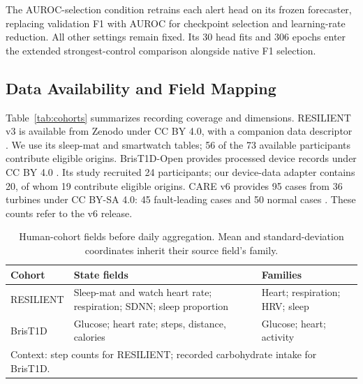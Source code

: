 The AUROC-selection condition retrains each alert head on its frozen forecaster, replacing validation F1 with AUROC for checkpoint selection and learning-rate reduction. All other settings remain fixed. Its 30 head fits and 306 epochs enter the extended strongest-control comparison alongside native F1 selection.

\subsection{Data Availability and Field Mapping}

\begin{table}[!tb]
\centering
\caption{Cohort coverage and input dimensions. Units are available/scorable people or CARE assets; $P/Q$ are state/context dimensions. Span and Observed are median calendar and observed days; $n/n^+$ count eligible/positive origins.}
\label{tab:cohorts}
\end{table}

Table~\ref{tab:cohorts} summarizes recording coverage and dimensions. RESILIENT v3 is available from Zenodo under CC BY 4.0, with a companion data descriptor \citep{hneD02,hneD03}. We use its sleep-mat and smartwatch tables; 56 of the 73 available participants contribute eligible origins. BrisT1D-Open provides processed device records under CC BY 4.0 \citep{hneD04}. Its study recruited 24 participants; our device-data adapter contains 20, of whom 19 contribute eligible origins. CARE v6 provides 95 cases from 36 turbines under CC BY-SA 4.0: 45 fault-leading cases and 50 normal cases \citep{hneD05,hneD06}. These counts refer to the v6 release.

\begin{table}[H]
\centering
\small
\caption{Human-cohort fields before daily aggregation. Mean and standard-deviation coordinates inherit their source field's family.}
\label{tab:appendix-fields}
\begin{tabular}{@{}p{}p{}p{}@{}}
\hline
Cohort & State fields & Families \\
\hline
RESILIENT & Sleep-mat and watch heart rate; respiration; SDNN; sleep proportion & Heart; respiration; HRV; sleep \\
BrisT1D & Glucose; heart rate; steps, distance, calories & Glucose; heart; activity \\
\hline
\multicolumn{3}{p{0.92\columnwidth}}{Context: step counts for RESILIENT; recorded carbohydrate intake for BrisT1D.} \\
\hline
\end{tabular}
\end{table}

